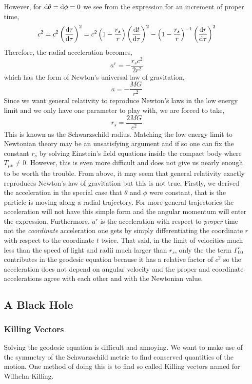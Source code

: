 \documentclass[11pt, a4paper]{article}
\begin{document}
However, for $\mathrm{d}\theta = \mathrm{d}\phi = 0$ we see from the expression for an increment of proper time,
\[ c^2  = c^2 \left( \frac{\mathrm{d}\tau}{\mathrm{d}\tau} \right)^2 =  c^2 \left(1 - \frac{r_s}{r} \right) \left( \frac{\mathrm{d}t}{\mathrm{d}\tau} \right)^2 - \left(1 - \frac{r_s}{r} \right)^{-1} \left( \frac{\mathrm{d}r}{\mathrm{d}\tau} \right)^2 \]
Therefore, the radial acceleration becomes,
\[ a^r  = -\frac{r_s c^2}{2r^2} \]
which has the form of Newton's universal law of gravitation,
\[ a = - \frac{MG}{r^2}\]
Since we want general relativity to reproduce Newton's laws in the low energy limit and we only have one parameter to play with, we are forced to take,
\[ r_s = \frac{2 M G}{c^2} \]
This is known as the Schwarzschild radius. Matching the low energy limit to Newtonian theory may be an unsatisfying argument and if so one can fix the constant $r_s$ by solving Einstein's field equations inside the compact body where $T_{\mu \nu} \neq 0$. However, this is even more difficult and does not give us nearly enough to be worth the trouble. From above, it may seem that general relativity exactly reproduces Newton's law of gravitation but this is not true. Firstly, we derived the acceleration in the special case that $\theta$ and $\phi$ were constant, that is the particle is moving along a radial trajectory. For more general trajectories the acceleration will not have this simple form and the angular momentum will enter the expression. Furthermore, $a^r$ is the acceleration with respect to \textit{proper} time not the \textit{coordinate} acceleration one gets by simply differentiating the coordinate $r$ with respect to the coordinate $t$ twice. That said, in the limit of velocities much less than the speed of light and radii much larger than $r_s$, only the the term $\Gamma^r_{00}$ contributes in the geodesic equation because it has a relative factor of $c^2$ so the acceleration does not depend on angular velocity and the proper and coordinate accelerations agree with each other and with the Newtonian value.   

\subsection{A Black Hole}  


\subsubsection{Killing Vectors}

Solving the geodesic equation is difficult and annoying. We want to make use of the symmetry of the Schwarzschild metric to find conserved quantities of the motion. One method of doing this is to find so called Killing vectors named for Wilhelm Killing.
\end{document}
